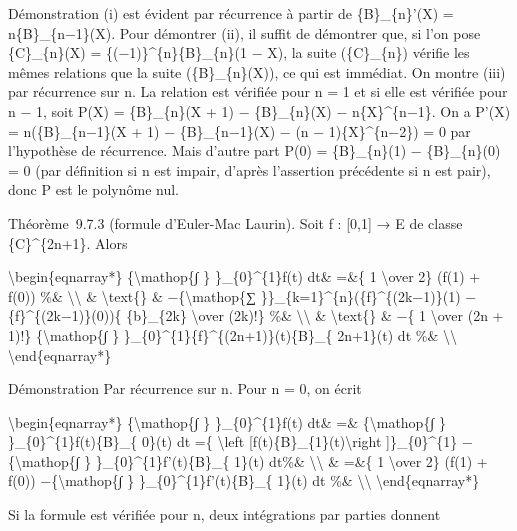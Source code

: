 \documentclass[]{article}
\begin{document}
Démonstration (i) est évident par récurrence à partir de
\{B\}\_\{n\}'(X) = n\{B\}\_\{n−1\}(X). Pour démontrer (ii), il suffit de
démontrer que, si l'on pose \{C\}\_\{n\}(X) =
\{(−1)\}\^{}\{n\}\{B\}\_\{n\}(1 − X), la suite (\{C\}\_\{n\}) vérifie
les mêmes relations que la suite (\{B\}\_\{n\}(X)), ce qui est immédiat.
On montre (iii) par récurrence sur n. La relation est vérifiée pour n =
1 et si elle est vérifiée pour n − 1, soit P(X) = \{B\}\_\{n\}(X + 1) −
\{B\}\_\{n\}(X) − n\{X\}\^{}\{n−1\}. On a P'(X) = n(\{B\}\_\{n−1\}(X +
1) − \{B\}\_\{n−1\}(X) − (n − 1)\{X\}\^{}\{n−2\}) = 0 par l'hypothèse de
récurrence. Mais d'autre part P(0) = \{B\}\_\{n\}(1) − \{B\}\_\{n\}(0) =
0 (par définition si n est impair, d'après l'assertion précédente si n
est pair), donc P est le polynôme nul.

Théorème~9.7.3 (formule d'Euler-Mac Laurin). Soit f : {[}0,1{]} → E de
classe \{C\}\^{}\{2n+1\}. Alors

\textbackslash{}begin\{eqnarray*\} \{\textbackslash{}mathop\{∫ \}
\}\_\{0\}\^{}\{1\}f(t) dt\& =\&\{ 1 \textbackslash{}over 2\} (f(1) +
f(0)) \%\& \textbackslash{}\textbackslash{} \& \textbackslash{}text\{\}
\& −\{\textbackslash{}mathop\{∑
\}\}\_\{k=1\}\^{}\{n\}(\{f\}\^{}\{(2k−1)\}(1) −
\{f\}\^{}\{(2k−1)\}(0))\{ \{b\}\_\{2k\} \textbackslash{}over (2k)!\}
\%\& \textbackslash{}\textbackslash{} \& \textbackslash{}text\{\} \& −\{
1 \textbackslash{}over (2n + 1)!\} \{\textbackslash{}mathop\{∫ \}
\}\_\{0\}\^{}\{1\}\{f\}\^{}\{(2n+1)\}(t)\{B\}\_\{ 2n+1\}(t) dt \%\&
\textbackslash{}\textbackslash{} \textbackslash{}end\{eqnarray*\}

Démonstration Par récurrence sur n. Pour n = 0, on écrit

\textbackslash{}begin\{eqnarray*\} \{\textbackslash{}mathop\{∫ \}
\}\_\{0\}\^{}\{1\}f(t) dt\& =\& \{\textbackslash{}mathop\{∫ \}
\}\_\{0\}\^{}\{1\}f(t)\{B\}\_\{ 0\}(t) dt =\{ \textbackslash{}left
{[}f(t)\{B\}\_\{1\}(t)\textbackslash{}right {]}\}\_\{0\}\^{}\{1\}
−\{\textbackslash{}mathop\{∫ \} \}\_\{0\}\^{}\{1\}f'(t)\{B\}\_\{ 1\}(t)
dt\%\& \textbackslash{}\textbackslash{} \& =\&\{ 1 \textbackslash{}over
2\} (f(1) + f(0)) −\{\textbackslash{}mathop\{∫ \}
\}\_\{0\}\^{}\{1\}f'(t)\{B\}\_\{ 1\}(t) dt \%\&
\textbackslash{}\textbackslash{} \textbackslash{}end\{eqnarray*\}

Si la formule est vérifiée pour n, deux intégrations par parties donnent
\end{document}
